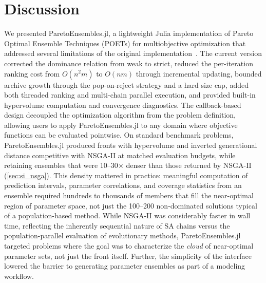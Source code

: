 \documentclass[preprint,review,12pt]{elsarticle}
\begin{document}
\section{Discussion}\label{sec:discussion}
We presented ParetoEnsembles.jl, a lightweight Julia implementation of Pareto Optimal Ensemble Techniques (POETs) for multiobjective optimization that addressed several limitations of the original implementation~\cite{Song2010,Bassen2016}. The current version corrected the dominance relation from weak to strict, reduced the per-iteration ranking cost from $O(n^2 m)$ to $O(nm)$ through incremental updating, bounded archive growth through the pop-on-reject strategy and a hard size cap, added both threaded ranking and multi-chain parallel execution, and provided built-in hypervolume computation and convergence diagnostics. The callback-based design decoupled the optimization algorithm from the problem definition, allowing users to apply ParetoEnsembles.jl to any domain where objective functions can be evaluated pointwise. On standard benchmark problems, ParetoEnsembles.jl produced fronts with hypervolume and inverted generational distance competitive with NSGA-II at matched evaluation budgets, while retaining ensembles that were 10--30$\times$ denser than those returned by NSGA-II (\cref{sec:si_nsga}). This density mattered in practice: meaningful computation of prediction intervals, parameter correlations, and coverage statistics from an ensemble required hundreds to thousands of members that fill the near-optimal region of parameter space, not just the 100--200 non-dominated solutions typical of a population-based method. While NSGA-II was considerably faster in wall time, reflecting the inherently sequential nature of SA chains versus the population-parallel evaluation of evolutionary methods, ParetoEnsembles.jl targeted problems where the goal was to characterize the \emph{cloud} of near-optimal parameter sets, not just the front itself. Further, the simplicity of the interface lowered the barrier to generating parameter ensembles as part of a modeling workflow.
\end{document}
